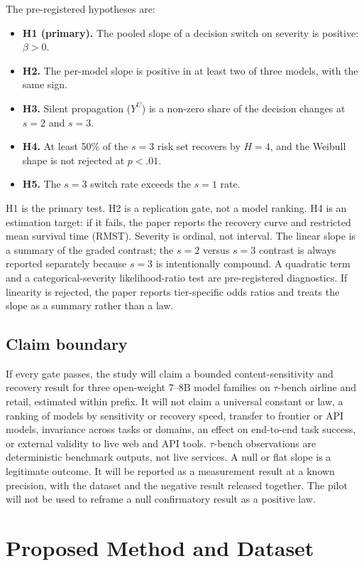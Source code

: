 \documentclass[11pt,a4paper]{article}
\begin{document}
The pre-registered hypotheses are:
\begin{itemize}
  \item \textbf{H1 (primary).} The pooled slope of a decision switch on severity is positive:
  $\beta>0$.
  \item \textbf{H2.} The per-model slope is positive in at least two of three models, with the same
  sign.
  \item \textbf{H3.} Silent propagation ($Y^{U}$) is a non-zero share of the decision changes at
  $s=2$ and $s=3$.
  \item \textbf{H4.} At least 50\% of the $s=3$ risk set recovers by $H=4$, and the Weibull shape is
  not rejected at $p<.01$.
  \item \textbf{H5.} The $s=3$ switch rate exceeds the $s=1$ rate.
\end{itemize}
H1 is the primary test. H2 is a replication gate, not a model ranking. H4 is an estimation target:
if it fails, the paper reports the recovery curve and restricted mean survival time (RMST).
Severity is ordinal, not interval. The linear slope is a summary of the graded contrast; the
$s=2$ versus $s=3$ contrast is always reported separately because $s=3$ is intentionally compound.
A quadratic term and a categorical-severity likelihood-ratio test are pre-registered diagnostics.
If linearity is rejected, the paper reports tier-specific odds ratios and treats the slope as a
summary rather than a law.

\subsection{Claim boundary}
If every gate passes, the study will claim a bounded content-sensitivity and recovery result for
three open-weight 7--8B model families on $\tau$-bench airline and retail, estimated within prefix.
It will not claim a universal constant or law, a ranking of models by sensitivity or recovery
speed, transfer to frontier or API models, invariance across tasks or domains, an effect on
end-to-end task success, or external validity to live web and API tools. $\tau$-bench observations
are deterministic benchmark outputs, not live services. A null or flat slope is a legitimate outcome. It will be reported as a measurement result at a
known precision, with the dataset and the negative result released together. The pilot will not be
used to reframe a null confirmatory result as a positive law.

\section{Proposed Method and Dataset}
\end{document}
